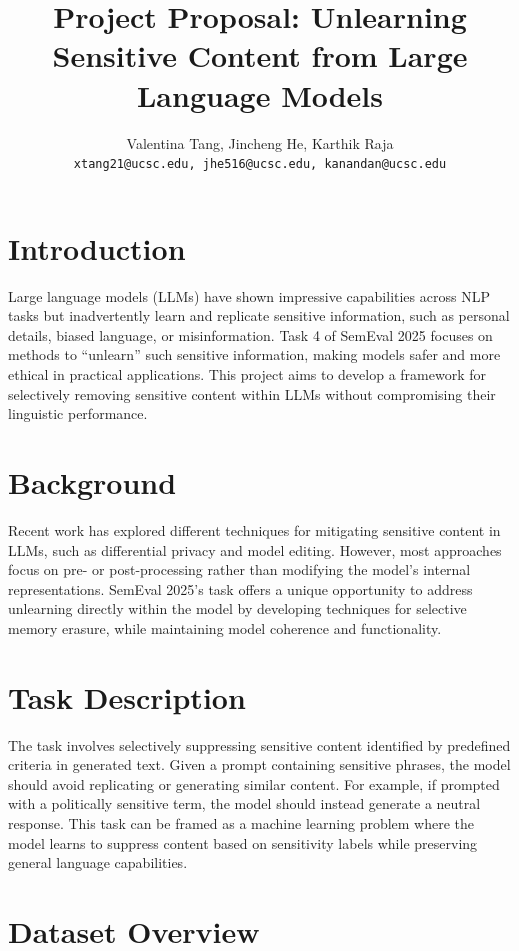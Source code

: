\documentclass[11pt]{article}
\title{Project Proposal: Unlearning Sensitive Content from Large Language Models}
\author{Valentina Tang, Jincheng He, Karthik Raja \\
\texttt{xtang21@ucsc.edu, jhe516@ucsc.edu, kanandan@ucsc.edu} \\}
\begin{document}
    \maketitle


    \section{Introduction}

    Large language models (LLMs) have shown impressive capabilities across NLP tasks but inadvertently learn and replicate sensitive information, such as personal details, biased language, or misinformation. Task 4 of SemEval 2025 focuses on methods to ``unlearn'' such sensitive information, making models safer and more ethical in practical applications. This project aims to develop a framework for selectively removing sensitive content within LLMs without compromising their linguistic performance.


    \section{Background}
    Recent work has explored different techniques for mitigating sensitive content in LLMs, such as differential privacy and model editing. However, most approaches focus on pre- or post-processing rather than modifying the model’s internal representations. SemEval 2025’s task offers a unique opportunity to address unlearning directly within the model by developing techniques for selective memory erasure, while maintaining model coherence and functionality.


    \section{Task Description}
    The task involves selectively suppressing sensitive content identified by predefined criteria in generated text. Given a prompt containing sensitive phrases, the model should avoid replicating or generating similar content. For example, if prompted with a politically sensitive term, the model should instead generate a neutral response. This task can be framed as a machine learning problem where the model learns to suppress content based on sensitivity labels while preserving general language capabilities.


    \section{Dataset Overview}
\end{document}
